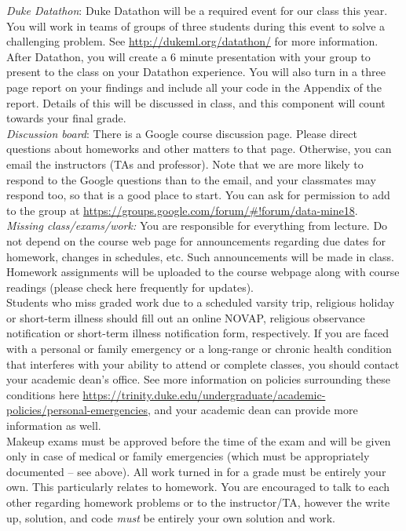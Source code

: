 \documentclass[11pt]{article}
\begin{document}
\emph{Duke Datathon}: Duke Datathon will be a required event for our class this year. You will work in teams of groups of three students during this event to solve a challenging problem. See \url{http://dukeml.org/datathon/} for more information. After Datathon, you will create a 6 minute presentation with your group to present to the class on your Datathon experience. You will also turn in a three page report on your findings and include all your code in the Appendix of the report. Details of this will be discussed in class, and this component will count towards your final grade. \\

\emph{Discussion board}:
There is a Google course discussion page. Please direct questions about homeworks and other matters to that page. Otherwise, you can email the instructors (TAs and professor). Note that we are more likely to respond to the Google questions than to the email, and your classmates may respond too, so that is a good place to start. You can ask for permission to add to the group at \url{https://groups.google.com/forum/#!forum/data-mine18}.\\



\emph{Missing class/exams/work:}
You are responsible for everything from lecture. Do not depend on the course web page for announcements regarding due dates for homework, changes in schedules, etc. Such announcements will be made in class. Homework assignments will be uploaded to the course webpage along with course readings (please check here frequently for updates).\\

Students who miss graded work due to a scheduled varsity trip, religious holiday or short-term illness should fill out an online NOVAP, religious observance notification or short-term illness notification form, respectively. If you are faced with a personal or family emergency or a long-range or chronic health condition that interferes with your ability to attend or complete classes, you should contact your academic dean's office. See more information on policies surrounding these conditions here \url{https://trinity.duke.edu/undergraduate/academic-policies/personal-emergencies}, and your academic dean can provide more information as well.\\

Makeup exams must be approved before the time of the exam and will be given only in case
of medical or family emergencies (which must be appropriately documented -- see above). All work turned in for a grade must be entirely your own. This particularly relates to homework. You are encouraged to talk to each other regarding homework problems or to the instructor/TA, however the write up, solution, and code \emph{must} be entirely your own solution and work. \\
\end{document}
